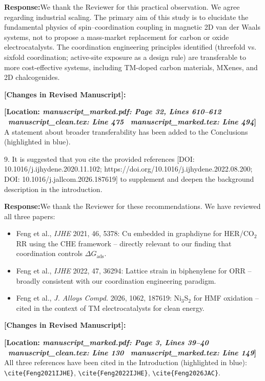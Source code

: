 \documentclass[11pt, sans, a4paper]{moderncv}
\newcommand{\response}{\vspace{0.4em}\noindent\textbf{\color{actionblue}Response:}\hspace{0.5em}}
\newcommand{\manuscriptchange}[1]{\vspace{0.4em}\noindent\textbf{\color{acsblue}[Changes in Revised Manuscript]:}\par\nopagebreak\vspace{0.15em}#1\vspace{0.4em}}
\begin{document}
\response We thank the Reviewer for this practical observation. We agree regarding industrial scaling. The primary aim of this study is to elucidate the fundamental physics of spin--coordination coupling in magnetic 2D van der Waals systems, not to propose a mass-market replacement for carbon or oxide electrocatalysts. The coordination engineering principles identified (threefold vs. sixfold coordination; active-site exposure as a design rule) are transferable to more cost-effective systems, including TM-doped carbon materials, MXenes, and 2D chalcogenides.

\manuscriptchange{\textbf{[Location: \textit{manuscript\_marked.pdf: Page 32, Lines 610--612} \textbar\ \textit{manuscript\_clean.tex: Line 475} \textbar\ \textit{manuscript\_marked.tex: Line 494}]}\\ A statement about broader transferability has been added to the Conclusions (highlighted in blue).}

\vspace{0.8em}

\begin{reviewercomment}
9. It is suggested that you cite the provided references [DOI: 10.1016/j.ijhydene.2020.11.102; https://doi.org/10.1016/j.ijhydene.2022.08.200; DOI: 10.1016/j.jallcom.2026.187619] to supplement and deepen the background description in the introduction.
\end{reviewercomment}

\response We thank the Reviewer for these recommendations. We have reviewed all three papers:
\begin{itemize}[leftmargin=1.5em, itemsep=0.2em]
\item Feng et al., \textit{IJHE} 2021, 46, 5378: Cu embedded in graphdiyne for HER/CO$_2$RR using the CHE framework -- directly relevant to our finding that coordination controls $\Delta G_{\mathrm{ads}}$.
\item Feng et al., \textit{IJHE} 2022, 47, 36294: Lattice strain in biphenylene for ORR -- broadly consistent with our coordination engineering paradigm.
\item Feng et al., \textit{J. Alloys Compd.} 2026, 1062, 187619: Ni$_3$S$_2$ for HMF oxidation -- cited in the context of TM electrocatalysts for clean energy.
\end{itemize}

\manuscriptchange{\textbf{[Location: \textit{manuscript\_marked.pdf: Page 3, Lines 39--40} \textbar\ \textit{manuscript\_clean.tex: Line 130} \textbar\ \textit{manuscript\_marked.tex: Line 149}]}\\ All three references have been cited in the Introduction (highlighted in blue): \texttt{\textbackslash cite\{Feng2021IJHE\}}, \texttt{\textbackslash cite\{Feng2022IJHE\}}, \texttt{\textbackslash cite\{Feng2026JAC\}}.}
\end{document}
